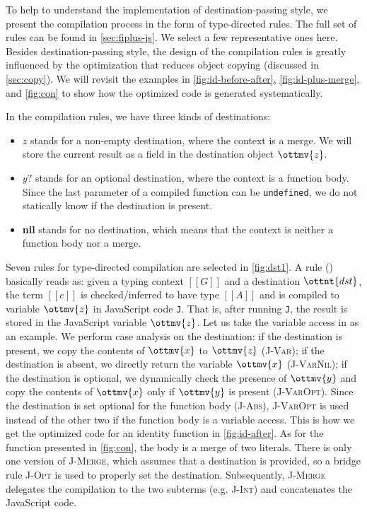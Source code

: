 To help to understand the implementation of destination-passing style, we
present the compilation process in the form of type-directed rules. The full set
of rules can be found in \autoref{sec:fiplus-js}. We select a few representative
ones here. Besides destination-passing style, the design of the compilation
rules is greatly influenced by the optimization that reduces object copying
(discussed in \autoref{sec:copy}). We will revisit the examples in
\autoref{fig:id-before-after}, \autoref{fig:id-plus-merge}, and
\autoref{fig:con} to show how the optimized code is generated systematically.

In the compilation rules, we have three kinds of destinations:
\begin{itemize}
\item $z$ stands for a non-empty destination, where the context is a merge. We
      will store the current result as a field in the destination object
      $\ottmv{z}$.
\item $y?$ stands for an optional destination, where the context is a function
      body. Since the last parameter of a compiled function can be
      \lstinline{undefined}, we do not statically know if the destination is
      present.
\item \textbf{nil} stands for no destination, which means that the context is
      neither a function body nor a merge.
\end{itemize}
Seven rules for type-directed compilation are selected in \autoref{fig:dst1}. A
rule (\compilation) basically reads as: given a typing context $[[G]]$ and a
destination $\ottnt{dst}$, the \fiplus term $[[e]]$ is checked/inferred to have
type $[[A]]$ and is compiled to variable $\ottmv{z}$ in JavaScript code
\texttt{J}. That is, after running \texttt{J}, the result is stored in the
JavaScript variable $\ottmv{z}$. Let us take the variable access in \fiplus as
an example. We perform case analysis on the destination: if the destination is
present, we copy the contents of $\ottmv{x}$ to $\ottmv{z}$ (\textsc{J-Var}); if
the destination is absent, we directly return the variable $\ottmv{x}$
(\textsc{J-VarNil}); if the destination is optional, we dynamically check the
presence of $\ottmv{y}$ and copy the contents of $\ottmv{x}$ only if $\ottmv{y}$
is present (\textsc{J-VarOpt}). Since the destination is set optional for the
function body (\textsc{J-Abs}), \textsc{J-VarOpt} is used instead of the other
two if the function body is a variable access. This is how we get the optimized
code for an identity function in \autoref{fig:id-after}. As for the function
presented in \autoref{fig:con}, the body is a merge of two literals. There is
only one version of \textsc{J-Merge}, which assumes that a destination is
provided, so a bridge rule \textsc{J-Opt} is used to properly set the
destination. Subsequently, \textsc{J-Merge} delegates the compilation to the two
subterms (e.g. \textsc{J-Int}) and concatenates the JavaScript code.

